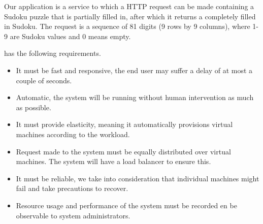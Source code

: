 Our application is a service to which a HTTP request can be made containing a Sudoku puzzle that is partially filled in, after which it returns a completely filled in Sudoku.
The request is a sequence of 81 digits (9 rows by 9 columns), where 1-9 are Sudoku values and 0 means empty. 

\appName{} has the following requirements.
\begin{itemize}
	\item It must be fast and responsive, the end user may suffer a delay of at most a couple of seconds.
	\item Automatic, the system will be running without human intervention as much as possible.
	\item It must provide elasticity, meaning it automatically provisions virtual machines according to the workload.
	\item Request made to the system must be equally distributed over virtual machines. The system will have a load balancer to ensure this.
	\item It must be reliable, we take into consideration that individual machines might fail and take precautions to recover.
	\item Resource usage and performance of the system must be recorded en be observable to system administrators.
\end{itemize}
